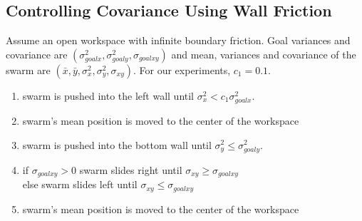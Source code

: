 \subsection{Controlling Covariance Using Wall Friction}\label{subsec:ClosedLoopCovarianceControl}
Assume an open workspace with infinite boundary friction. Goal variances and covariance are  $(\sigma_{goalx}^2,\sigma_{goaly}^2, \sigma_{goalxy})$ and mean, variances and covariance of the swarm  are $( \bar{x},\bar{y},\sigma_x^2,\sigma_y^2, \sigma_{xy})$. For our experiments, $c_1 = 0.1$.
\begin{enumerate}
\item swarm is pushed into the left wall until $\sigma_x^2< c_1\sigma_{goalx}^2$.  
\item swarm's mean position is moved to the center of the workspace
\item swarm is pushed into the bottom wall until $\sigma_y^2 \le \sigma_{goaly}^2$. 
\item if $\sigma_{goalxy}>0$ swarm slides right until $\sigma_{xy} \ge \sigma_{goalxy}$ \\
else swarm slides left until $\sigma_{xy} \le \sigma_{goalxy}$ 
\item  swarm's mean position is moved to the center of the workspace
\end{enumerate}



